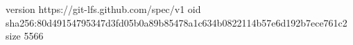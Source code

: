 version https://git-lfs.github.com/spec/v1
oid sha256:80d49154795347d3fd05b0a89b85478a1c634b0822114b57e6d192b7ece761c2
size 5566
